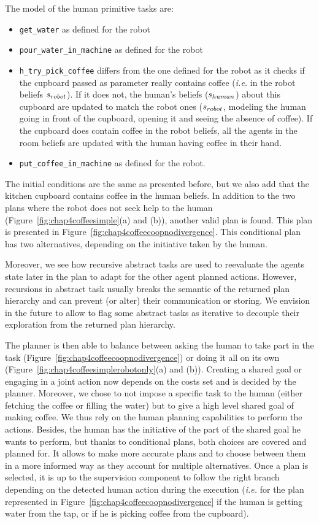 \documentclass[a4paper,11pt,twoside]{StyleThese}
\begin{document}
The model of the human primitive tasks are:
\begin{itemize}
\item \verb'get_water' as defined for the robot
\item \verb'pour_water_in_machine' as defined for the robot
\item \verb'h_try_pick_coffee' differs from the one defined for the robot as it checks if the cupboard passed as parameter really contains coffee (\textit{i.e.} in the robot beliefs $s_{robot}$). If it does not, the human's beliefs ($s_{human}$) about this cupboard are updated to match the robot ones ($s_{robot}$, modeling the human going in front of the cupboard, opening it and seeing the absence of coffee). If the cupboard does contain coffee in the robot beliefs, all the agents in the room beliefs are updated with the human having coffee in their hand.
\item \verb'put_coffee_in_machine' as defined for the robot.
\end{itemize}

The initial conditions are the same as presented before, but we also add that the kitchen cupboard contains coffee in the human beliefs. In addition to the two plans where the robot does not seek help to the human (Figure~\ref{fig:chap4coffeesimple}(a) and (b)), another valid plan is found. This plan is presented in Figure~\ref{fig:chap4coffeecoopnodivergence}. This conditional plan has two alternatives, depending on the initiative taken by the human.

Moreover, we see how recursive abstract tasks are used to reevaluate the agents state later in the plan to adapt for the other agent planned actions. However, recursions in abstract task usually breaks the semantic of the returned plan hierarchy and can prevent (or alter) their communication or storing. We envision in the future to allow to flag some abstract tasks as iterative to decouple their exploration from the returned plan hierarchy.

The planner is then able to balance between asking the human to take part in the task (Figure~\ref{fig:chap4coffeecoopnodivergence}) or doing it all on its own (Figure~\ref{fig:chap4coffeesimplerobotonly}(a) and (b)). Creating a shared goal or engaging in a joint action now depends on the costs set and is decided by the planner. Moreover, we chose to not impose a specific task to the human (either fetching the coffee or filling the water) but to give a high level shared goal of making coffee. We thus rely on the human planning capabilities to perform the actions. Besides, the human has the initiative of the part of the shared goal he wants to perform, but thanks to conditional plans, both choices are covered and planned for. It allows to make more accurate plans and to choose between them in a more informed way as they account for multiple alternatives. Once a plan is selected, it is up to the supervision component to follow the right branch depending on the detected human action during the execution (\textit{i.e.} for the plan represented in Figure~\ref{fig:chap4coffeecoopnodivergence} if the human is getting water from the tap, or if he is picking coffee from the cupboard).
\end{document}
